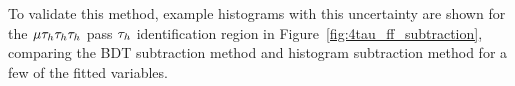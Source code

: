 To validate this method, example histograms with this uncertainty are shown for the $\mu\tau_{h}\tau_{h}\tau_{h}$ pass $\tau_{h}$ identification region in Figure~\ref{fig:4tau_ff_subtraction}, comparing the \ac{BDT} subtraction method and histogram subtraction method for a few of the fitted variables. \\

\begin{figure}[p!]
\centering
     \\

\end{figure}

